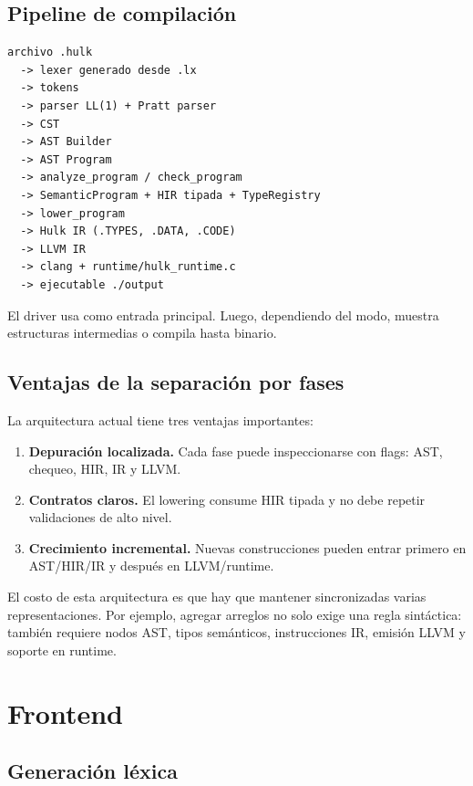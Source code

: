 \documentclass[12pt,letterpaper]{article}
\newcommand{\repo}[1]{\texttt{\detokenize{#1}}}
\begin{document}
\subsection{Pipeline de compilación}

\begin{lstlisting}[language=IR,caption={Pipeline de alto nivel}]
archivo .hulk
  -> lexer generado desde .lx
  -> tokens
  -> parser LL(1) + Pratt parser
  -> CST
  -> AST Builder
  -> AST Program
  -> analyze_program / check_program
  -> SemanticProgram + HIR tipada + TypeRegistry
  -> lower_program
  -> Hulk IR (.TYPES, .DATA, .CODE)
  -> LLVM IR
  -> clang + runtime/hulk_runtime.c
  -> ejecutable ./output
\end{lstlisting}

El driver usa \repo{parse_hulk_types_program} como entrada principal. Luego, dependiendo del modo, muestra estructuras intermedias o compila hasta binario.

\subsection{Ventajas de la separación por fases}

La arquitectura actual tiene tres ventajas importantes:

\begin{enumerate}[label=\arabic*.]
    \item \textbf{Depuración localizada.} Cada fase puede inspeccionarse con flags: AST, chequeo, HIR, IR y LLVM.
    \item \textbf{Contratos claros.} El lowering consume HIR tipada y no debe repetir validaciones de alto nivel.
    \item \textbf{Crecimiento incremental.} Nuevas construcciones pueden entrar primero en AST/HIR/IR y después en LLVM/runtime.
\end{enumerate}

El costo de esta arquitectura es que hay que mantener sincronizadas varias representaciones. Por ejemplo, agregar arreglos no solo exige una regla sintáctica: también requiere nodos AST, tipos semánticos, instrucciones IR, emisión LLVM y soporte en runtime.

\section{Frontend}

\subsection{Generación léxica}
\end{document}
